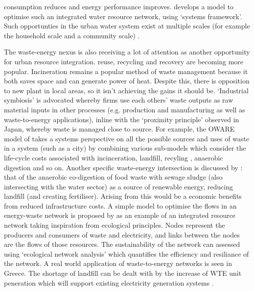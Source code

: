 consumption reduces and energy performance improves. \citet{Hardy2005} develops a model to optimise such an integrated water resource network, using `systems framework'. Such opportunties in the urban water system exist at multiple scales (for example the household scale and a community scale) \citep{Makropoulos2008}.

The waste-energy nexus is also receiving a lot of attention as another opportunity for urban resource integration. \citet{Geng2010} reuse, recycling and recovery are becoming more popular. Incineration remains a popular method of waste management because it both saves space and can generate power of heat. Despite  this, there is opposition to new plant in local areas, so it isn't achieving the gains it should be. `Industrial symbiosis' is advocated whereby firms use each others' waste outputs as raw material inputs in other processes (e.g. production and manufacturing as well as waste-to-energy applications), inline with the `proximity principle' observed in Japan, whereby waste is managed close to source. For example, the OWARE model of \citep{Eriksson2002} takes a systems perspective on all the possible sources and uses of waste in a system (such as a city) by combining various sub-models which consider the life-cycle costs associated with incinceration, landfill, recyling , anaerobic digestion and so on.
Another specific waste-energy intersection is discussed by \citet{Iacovidou2012}: that of the anaerobic co-digestion of food waste with sewage sludge (also intersecting with the water sector) as a source of renewable energy, reducing landfill (and creating fertiliser). Arising from this would be a economic benefits from reduced infrastructure costs. A simple model to optimise the flows in an energy-waste network is proposed by \citep{Kharrazi2012} as an example of an integrated resource network taking inspiration from ecological principles. Nodes represent the producers and consumers of waste and electricity, and links between the nodes are the flows of those resources. The sustainability of the network can assessed using `ecological network analysis' which quantifies the efficiency and resiliance of the network. A real world application of waste-to-energy networks is seen in Greece. The shortage of landfill can be dealt with by the increase of WTE unit peneration which will support existing electricity generation systems \citep{Xydis2012}.

